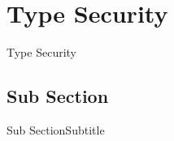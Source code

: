 \section{Type Security}
\begin{frame}{Type Security}

\end{frame}

\subsection{Sub Section}
\begin{frame}{Sub Section}{Subtitle}

\end{frame}